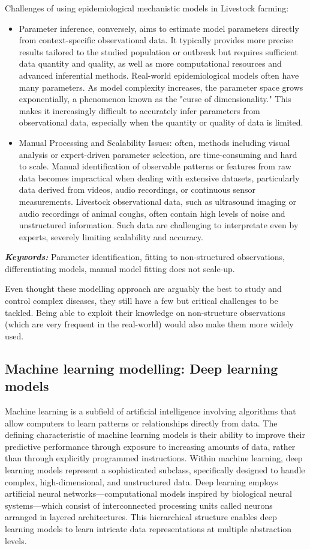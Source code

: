 Challenges of using epidemiological mechanistic models in Livestock farming:

\begin{itemize}
    \item Parameter inference, conversely, aims to estimate model parameters directly from context-specific observational data. It typically provides more precise results tailored to the studied population or outbreak but requires sufficient data quantity and quality, as well as more computational resources and advanced inferential methods. Real-world epidemiological models often have many parameters. As model complexity increases, the parameter space grows exponentially, a phenomenon known as the "curse of dimensionality." This makes it increasingly difficult to accurately infer parameters from observational data, especially when the quantity or quality of data is limited. 
    \item Manual Processing and Scalability Issues: often, methods including visual analysis or expert-driven parameter selection, are time-consuming and hard to scale. Manual identification of observable patterns or features from raw data becomes impractical when dealing with extensive datasets, particularly data derived from videos, audio recordings, or continuous sensor measurements. Livestock observational data, such as ultrasound imaging or audio recordings of animal coughs, often contain high levels of noise and unstructured information. Such data are challenging to interpretate even by experts, severely limiting scalability and accuracy.
\end{itemize}

\textit{\textbf{Keywords:}} Parameter identification, fitting to non-structured observations, differentiating models, manual model fitting does not scale-up.

Even thought these modelling approach are arguably the best to study and control complex diseases, they still have a few but critical challenges to be tackled. Being able to exploit their knowledge on non-structure observations (which are very frequent in the real-world) would also make them more widely used. 


\subsection{Machine learning modelling: Deep learning models}
Machine learning is a subfield of artificial intelligence involving algorithms that allow computers to learn patterns or relationships directly from data. The defining characteristic of machine learning models is their ability to improve their predictive performance through exposure to increasing amounts of data, rather than through explicitly programmed instructions. Within machine learning, deep learning models represent a sophisticated subclass, specifically designed to handle complex, high-dimensional, and unstructured data. Deep learning employs artificial neural networks—computational models inspired by biological neural systems—which consist of interconnected processing units called neurons arranged in layered architectures. This hierarchical structure enables deep learning models to learn intricate data representations at multiple abstraction levels.

